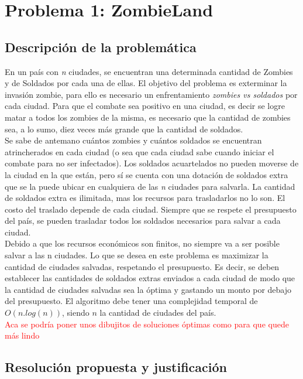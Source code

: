 \section{Problema 1: ZombieLand}

\subsection{Descripci\'on de la problem\'atica}

En un pa\'is con \emph{n} ciudades, se encuentran una determinada cantidad de Zombies y de Soldados por cada una de ellas. El objetivo del problema es exterminar la invasi\'on zombie, para ello es necesario un enfrentamiento \textit{zombies vs soldados} por cada ciudad. Para que el combate sea positivo en una ciudad, es decir se logre matar a todos los zombies de la misma, es necesario que la cantidad de zombies sea, a lo sumo, diez veces m\'as grande que la cantidad de soldados.\\

Se sabe de antemano cu\'antos zombies y cu\'antos soldados se encuentran atrincherados en cada ciudad (o sea que cada ciudad sabe cuando iniciar el combate para no ser infectados). Los soldados acuartelados no pueden moverse de la ciudad en la que est\'an, pero s\'i se cuenta con una dotaci\'on de soldados extra que se la puede ubicar en cualquiera de las \emph{n} ciudades para salvarla. La cantidad de soldados extra es ilimitada, mas los recursos para trasladarlos no lo son. El costo del traslado depende de cada ciudad. Siempre que se respete el presupuesto del pa\'is, se pueden trasladar todos los soldados necesarios para salvar a cada ciudad.\\

Debido a que los recursos econ\'omicos son finitos, no siempre va a ser posible salvar a las n ciudades. Lo que se desea en este problema es maximizar la cantidad de ciudades salvadas, respetando el presupuesto. Es decir, se deben establecer las cantidades de soldados extras enviados a cada ciudad de modo que la cantidad de ciudades salvadas sea la \'optima y gastando un monto por debajo del presupuesto.  El algoritmo debe tener una complejidad temporal de $O(n.log(n))$, siendo $n$ la cantidad de ciudades del pa\'is.\\

\textcolor{red}{Aca se podr\'ia poner unos dibujitos de soluciones \'optimas como para que quede m\'as lindo}


\newpage
\subsection{Resoluci\'on propuesta y justificaci\'on}

